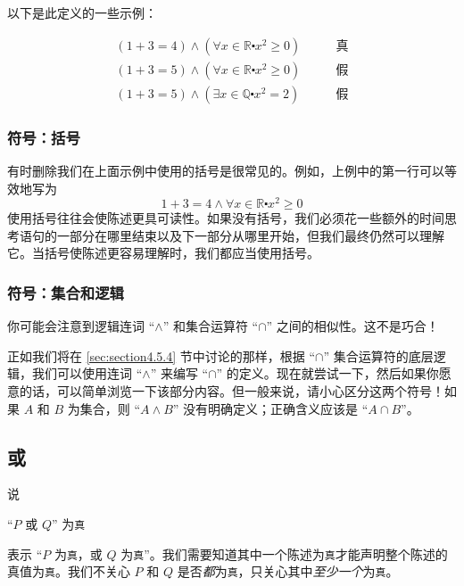 以下是此定义的一些示例：

\begin{example}
    \begin{align*}
        (1 + 3 = 4) \land (\forall x \in \mathbb{R} \centerdot x^2 \ge 0) \qquad &\text{真} \\
        (1 + 3 = 5) \land (\forall x \in \mathbb{R} \centerdot x^2 \ge 0) \qquad &\text{假} \\
        (1 + 3 = 5) \land (\exists x \in \mathbb{Q} \centerdot x^2 = 2)   \qquad &\text{假}
    \end{align*}
\end{example}

\subsubsection*{符号：括号}

有时删除我们在上面示例中使用的括号是很常见的。例如，上例中的第一行可以等效地写为
\[1 + 3 = 4 \land \forall x \in \mathbb{R} \centerdot x^2 \ge 0\]
使用括号往往会使陈述更具可读性。如果没有括号，我们必须花一些额外的时间思考语句的一部分在哪里结束以及下一部分从哪里开始，但我们最终仍然可以理解它。当括号使陈述更容易理解时，我们都应当使用括号。

\subsubsection*{符号：集合和逻辑}

你可能会注意到逻辑连词 ``$\land$'' 和集合运算符 ``$\cap$'' 之间的相似性。这不是巧合！

正如我们将在 \ref{sec:section4.5.4} 节中讨论的那样，根据 ``$\cap$'' 集合运算符的底层逻辑，我们可以使用连词 ``$\land$'' 来编写 ``$\cap$'' 的定义。现在就尝试一下，然后如果你愿意的话，可以简单浏览一下该部分内容。但一般来说，请小心区分这两个符号！如果 $A$ 和 $B$ 为集合，则 ``$A \land B$'' 没有明确定义；正确含义应该是 ``$A \cap B$''。

\subsection{或}

说
\begin{center}
    ``$P$ 或 $Q$'' 为\verb|真|
\end{center}

表示 ``$P$ 为\verb|真|，或 $Q$ 为\verb|真|''。我们需要知道其中一个陈述为\verb|真|才能声明整个陈述的真值为\verb|真|。我们不关心 $P$ 和 $Q$ 是否\emph{都}为\verb|真|，只关心其中\emph{至少一个}为\verb|真|。

